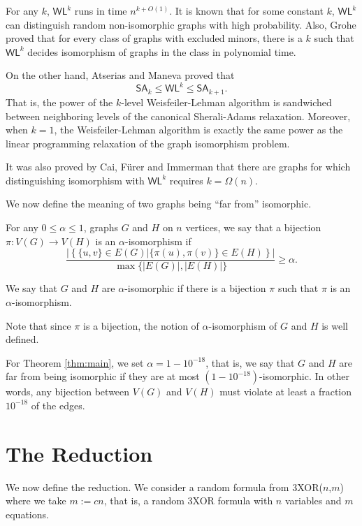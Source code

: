 \documentclass[a4paper,twoside,justified]{tufte-handout}
\begin{document}
For any $k$, $\textsf{WL}^k$ runs in time $n^{k+O(1)}$.
It is known that for some constant $k$, $\textsf{WL}^k$ can distinguish random non-isomorphic graphs
with high probability. Also, Grohe \cite{groheisomorphism} proved that 
for every class of graphs with excluded minors, there is a $k$ such that 
$\textsf{WL}^k$ decides isomorphism of graphs in the class in polynomial time.

On the other hand, Atserias and Maneva \cite{sheraliadamsisomorphism} proved that
\[
\mathsf{SA}_k \le \textsf{WL}^k \le \mathsf{SA}_{k+1}.
\]
That is, the power of the $k$-level Weisfeiler-Lehman algorithm is sandwiched between
neighboring levels of the canonical Sherali-Adams relaxation. Moreover, when $k=1$, 
the Weisfeiler-Lehman algorithm is exactly the same power as the linear programming relaxation of
the graph isomorphism problem.

It was also proved by Cai, F{\"{u}}rer and Immerman \cite{cai1992optimal} that there are graphs
for which distinguishing isomorphism with $\textsf{WL}^k$ requires $k=\Omega(n)$.

We now define the meaning of two graphs being ``far from'' isomorphic.
\begin{definition}\label{def:alpha-iso}
  For any $0 \le \alpha \le 1$, graphs $G$ and $H$ on $n$ vertices, we say that a bijection
  $\pi:V(G) \to V(H)$ is an $\alpha$-isomorphism if
  \[
  \frac{|\left\{ \{u,v\} \in E(G) | \{\pi(u),\pi(v)\} \in E(H) \right\}|}{\max \{|E(G)|,|E(H)|\}} \ge \alpha.
  \]

  We say that $G$ and $H$ are $\alpha$-isomorphic if there is a bijection $\pi$ such that
  $\pi$ is an $\alpha$-isomorphism.
\end{definition}
\begin{remark}
  Note that since $\pi$ is a bijection, the notion of $\alpha$-isomorphism of $G$ and $H$ 
  is well defined.
\end{remark}
For Theorem \ref{thm:main}, we set $\alpha=1-10^{-18}$, that is, we say that $G$ and $H$ are far from being
isomorphic if they are at most $(1-10^{-18})$-isomorphic. In other words, any bijection between $V(G)$ and $V(H)$
must violate at least a fraction $10^{-18}$ of the edges.

\section{The Reduction}
We now define the reduction. We consider a random formula from 3XOR($n$,$m$) where we take $m:=cn$,
that is, a random 3XOR formula with $n$ variables and $m$ equations.
\end{document}
